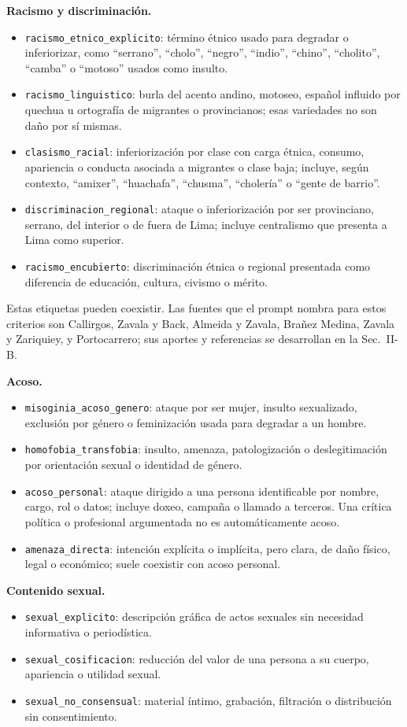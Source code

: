 \textbf{Racismo y discriminación.}
\begin{itemize}
\item \texttt{racismo\_etnico\_explicito}: término étnico usado para degradar o inferiorizar, como ``serrano'', ``cholo'', ``negro'', ``indio'', ``chino'', ``cholito'', ``camba'' o ``motoso'' usados como insulto.
\item \texttt{racismo\_linguistico}: burla del acento andino, motoseo, español influido por quechua u ortografía de migrantes o provincianos; esas variedades no son daño por sí mismas.
\item \texttt{clasismo\_racial}: inferiorización por clase con carga étnica, consumo, apariencia o conducta asociada a migrantes o clase baja; incluye, según contexto, ``amixer'', ``huachafa'', ``chusma'', ``cholería'' o ``gente de barrio''.
\item \texttt{discriminacion\_regional}: ataque o inferiorización por ser provinciano, serrano, del interior o de fuera de Lima; incluye centralismo que presenta a Lima como superior.
\item \texttt{racismo\_encubierto}: discriminación étnica o regional presentada como diferencia de educación, cultura, civismo o mérito.
\end{itemize}
Estas etiquetas pueden coexistir. Las fuentes que el prompt nombra para estos criterios son Callirgos, Zavala y Back, Almeida y Zavala, Brañez Medina, Zavala y Zariquiey, y Portocarrero; sus aportes y referencias se desarrollan en la Sec.~II-B.

\textbf{Acoso.}
\begin{itemize}
\item \texttt{misoginia\_acoso\_genero}: ataque por ser mujer, insulto sexualizado, exclusión por género o feminización usada para degradar a un hombre.
\item \texttt{homofobia\_transfobia}: insulto, amenaza, patologización o deslegitimación por orientación sexual o identidad de género.
\item \texttt{acoso\_personal}: ataque dirigido a una persona identificable por nombre, cargo, rol o datos; incluye doxeo, campaña o llamado a terceros. Una crítica política o profesional argumentada no es automáticamente acoso.
\item \texttt{amenaza\_directa}: intención explícita o implícita, pero clara, de daño físico, legal o económico; suele coexistir con acoso personal.
\end{itemize}

\textbf{Contenido sexual.}
\begin{itemize}
\item \texttt{sexual\_explicito}: descripción gráfica de actos sexuales sin necesidad informativa o periodística.
\item \texttt{sexual\_cosificacion}: reducción del valor de una persona a su cuerpo, apariencia o utilidad sexual.
\item \texttt{sexual\_no\_consensual}: material íntimo, grabación, filtración o distribución sin consentimiento.
\end{itemize}

